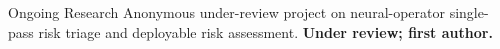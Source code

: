 \begin{rubric}{Ongoing Research}
\entry*[NeurIPS 2026]
  Anonymous under-review project on neural-operator single-pass risk triage and deployable risk assessment. \textbf{Under review; first author.}
\end{rubric}
